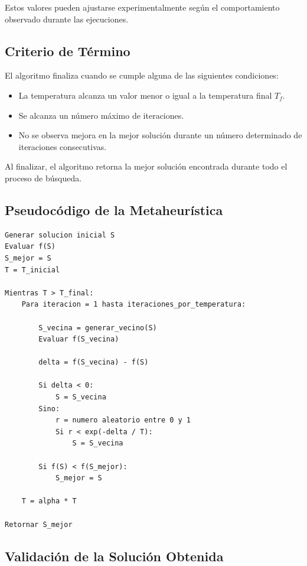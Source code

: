 Estos valores pueden ajustarse experimentalmente según el comportamiento observado durante las ejecuciones.

\subsection{Criterio de Término}

El algoritmo finaliza cuando se cumple alguna de las siguientes condiciones:

\begin{itemize}
    \item La temperatura alcanza un valor menor o igual a la temperatura final $T_f$.
    \item Se alcanza un número máximo de iteraciones.
    \item No se observa mejora en la mejor solución durante un número determinado de iteraciones consecutivas.
\end{itemize}

Al finalizar, el algoritmo retorna la mejor solución encontrada durante todo el proceso de búsqueda.

\subsection{Pseudocódigo de la Metaheurística}

\begin{lstlisting}
Generar solucion inicial S
Evaluar f(S)
S_mejor = S
T = T_inicial

Mientras T > T_final:
    Para iteracion = 1 hasta iteraciones_por_temperatura:
        
        S_vecina = generar_vecino(S)
        Evaluar f(S_vecina)
        
        delta = f(S_vecina) - f(S)
        
        Si delta < 0:
            S = S_vecina
        Sino:
            r = numero aleatorio entre 0 y 1
            Si r < exp(-delta / T):
                S = S_vecina
        
        Si f(S) < f(S_mejor):
            S_mejor = S
    
    T = alpha * T

Retornar S_mejor
\end{lstlisting}

\subsection{Validación de la Solución Obtenida}

